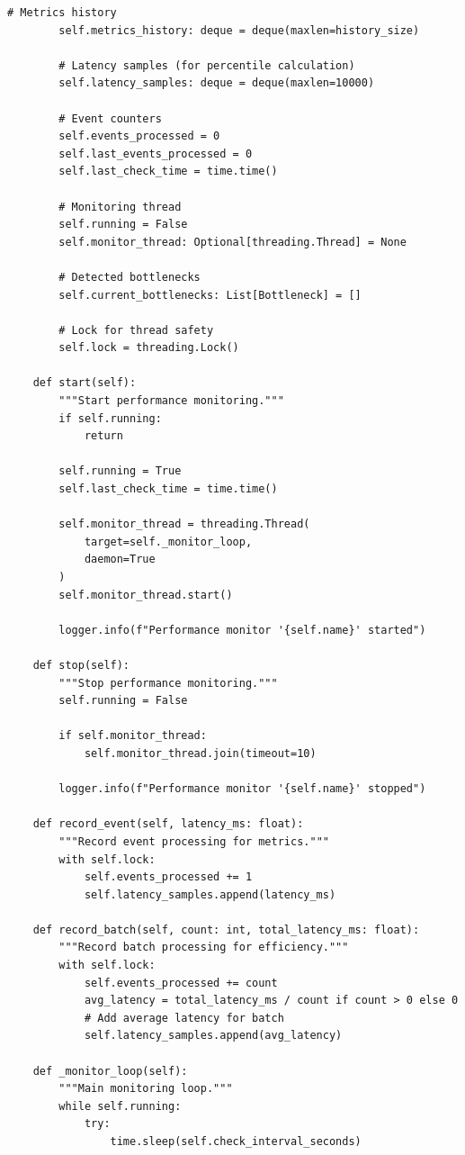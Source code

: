 \begin{lstlisting}[style=python, caption={Performance Monitor with Bottleneck Detection}]
        # Metrics history
        self.metrics_history: deque = deque(maxlen=history_size)

        # Latency samples (for percentile calculation)
        self.latency_samples: deque = deque(maxlen=10000)

        # Event counters
        self.events_processed = 0
        self.last_events_processed = 0
        self.last_check_time = time.time()

        # Monitoring thread
        self.running = False
        self.monitor_thread: Optional[threading.Thread] = None

        # Detected bottlenecks
        self.current_bottlenecks: List[Bottleneck] = []

        # Lock for thread safety
        self.lock = threading.Lock()

    def start(self):
        """Start performance monitoring."""
        if self.running:
            return

        self.running = True
        self.last_check_time = time.time()

        self.monitor_thread = threading.Thread(
            target=self._monitor_loop,
            daemon=True
        )
        self.monitor_thread.start()

        logger.info(f"Performance monitor '{self.name}' started")

    def stop(self):
        """Stop performance monitoring."""
        self.running = False

        if self.monitor_thread:
            self.monitor_thread.join(timeout=10)

        logger.info(f"Performance monitor '{self.name}' stopped")

    def record_event(self, latency_ms: float):
        """Record event processing for metrics."""
        with self.lock:
            self.events_processed += 1
            self.latency_samples.append(latency_ms)

    def record_batch(self, count: int, total_latency_ms: float):
        """Record batch processing for efficiency."""
        with self.lock:
            self.events_processed += count
            avg_latency = total_latency_ms / count if count > 0 else 0
            # Add average latency for batch
            self.latency_samples.append(avg_latency)

    def _monitor_loop(self):
        """Main monitoring loop."""
        while self.running:
            try:
                time.sleep(self.check_interval_seconds)


\end{lstlisting}
